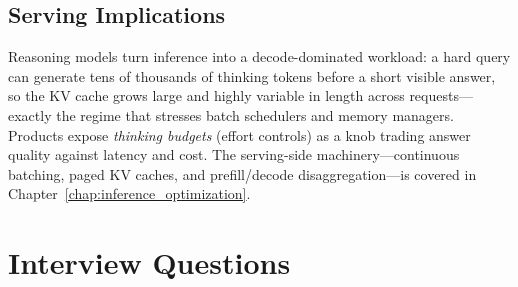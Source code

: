 \subsection{Serving Implications}

Reasoning models turn inference into a decode-dominated workload: a hard query can generate tens of thousands of thinking tokens before a short visible answer, so the KV cache grows large and highly variable in length across requests---exactly the regime that stresses batch schedulers and memory managers. Products expose \textit{thinking budgets} (effort controls) as a knob trading answer quality against latency and cost. The serving-side machinery---continuous batching, paged KV caches, and prefill/decode disaggregation---is covered in Chapter~\ref{chap:inference_optimization}.

\section{Interview Questions}
\label{sec:rl_interview}


